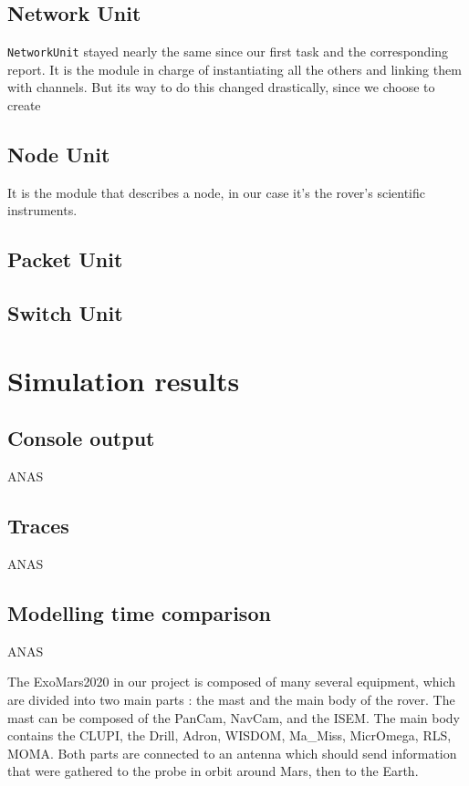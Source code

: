 \documentclass[12pt,a4paper]{article}
\begin{document}
\subsection{Network Unit}
\texttt{NetworkUnit} stayed nearly the same since our first task and the corresponding report. It is the module in charge of instantiating all the others and linking them with channels. But its way to do this changed drastically, since we choose to create
\subsection{Node Unit}

It is the module that describes a node, in our case it's the rover's scientific instruments. 

\subsection{Packet Unit}
\subsection{Switch Unit}


\pagebreak

\section{Simulation results}

\subsection{Console output}

ANAS

\subsection{Traces}

ANAS

\subsection{Modelling time comparison}

ANAS

The ExoMars2020 in our project is composed of many several equipment, which are divided into two main parts : the mast and the main body of the rover. The mast can be composed of the PanCam, NavCam, and the ISEM. The main body contains the CLUPI, the Drill, Adron, WISDOM, Ma\_Miss, MicrOmega, RLS, MOMA. Both parts are connected to an antenna which should send information that were gathered to the probe in orbit around Mars, then to the Earth.\smallbreak
\end{document}
